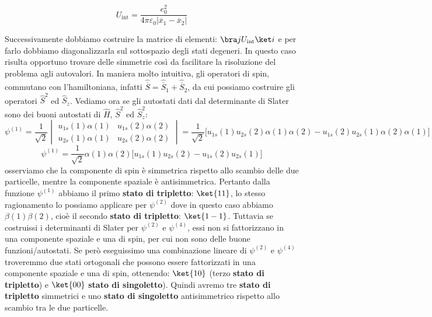 \begin{equation*}
    U_{\text{int}}=\frac{e_0^2}{4\pi\varepsilon_0|\overline{x}_1-\overline{x}_2|}
\end{equation*}

Successivamente dobbiamo costruire la matrice di elementi: $\bra j U_{\text{int}}\ket i$ e per farlo dobbiamo diagonalizzarla sul sottospazio degli stati degeneri. In questo caso risulta opportuno trovare delle simmetrie così da facilitare la risoluzione del problema agli autovalori. In maniera molto intuitiva, gli operatori di spin, commutano con l'hamiltoniana, infatti $\hat{\overline S} = \hat{\overline{S}}_1+\hat{\overline{S}}_2$, da cui possiamo costruire gli operatori $\hat S^2$ ed $\hat S_z$.
Vediamo ora se gli autostati dati dal determinante di Slater sono dei buoni autostati di $\hat H$, $\hat S^2$ ed $\hat S_z^2$:
\begin{equation*}
    \psi^{(1)}=\frac {1}{\sqrt 2} \begin{vmatrix} u_{1s}(1)\alpha(1) & u_{1s}(2)\alpha(2) \\ u_{2s}(1)\alpha(1) & u_{2s}(2)\alpha(2) \end{vmatrix}=\frac {1}{\sqrt 2} \big[u_{1s}(1)u_{2s}(2)\alpha(1)\alpha(2)-u_{1s}(2)u_{2s}(1)\alpha(2)\alpha(1)\big]
\end{equation*}
\begin{equation*}
    \psi^{(1)}=\frac {1}{\sqrt 2}\alpha(1)\alpha(2)\big[u_{1s}(1)u_{2s}(2)-u_{1s}(2)u_{2s}(1)\big]
\end{equation*}
osserviamo che la componente di spin è simmetrica rispetto allo scambio delle due particelle, mentre la componente spaziale è antisimmetrica.
Pertanto dalla funzione $\psi^{(1)}$ abbiamo il primo \textbf{stato di tripletto}: $\ket{11}$, lo stesso ragionamento lo possiamo applicare per $\psi^{(2)}$ dove in questo caso abbiamo $\beta(1)\beta(2)$, cioè il secondo \textbf{stato di tripletto}: $\ket{1-1}$. Tuttavia se costruissi i determinanti di Slater per $\psi^{(2)}$ e $\psi^{(4)}$, essi non si fattorizzano in una componente spaziale e una di spin, per cui non sono delle buone funzioni/autostati. Se però eseguissimo una combinazione lineare di $\psi^{(2)}$ e $\psi^{(4)}$ troveremmo due stati ortogonali che possono essere fattorizzati in una componente spaziale e una di spin, ottenendo: $\ket{10}$ (terzo \textbf{stato di tripletto}) e $\ket{00}$ \textbf{stato di singoletto}). Quindi avremo tre \textbf{stato di tripletto} simmetrici e uno \textbf{stato di singoletto} antisimmetrico rispetto allo scambio tra le due particelle.

